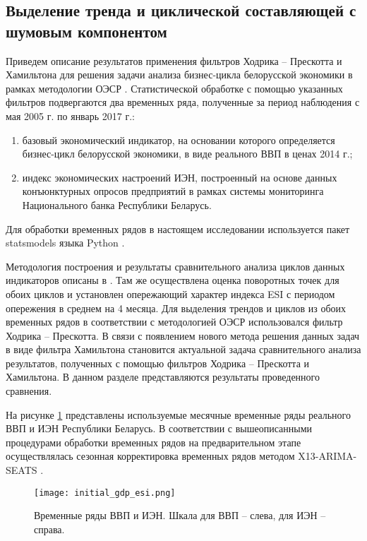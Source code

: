 \documentclass[a4paper,14pt]{extreport}
\begin{document}
	\subsection{Выделение тренда и циклической составляющей с шумовым компонентом}
	
	Приведем описание результатов применения фильтров Ходрика – Прескотта и Хамильтона для решения задачи анализа бизнес-цикла белорусской экономики в рамках методологии ОЭСР \cite{oecdCycleExtraction}. Статистической обработке с помощью указанных фильтров подвергаются два временных ряда, полученные за период наблюдения с мая 2005 г. по январь 2017 г.: 
	
	\begin{enumerate}
		\item базовый экономический индикатор, на основании которого определяется бизнес-цикл белорусской экономики, в виде реального ВВП в ценах 2014 г.;
		\item индекс экономических настроений ИЭН, построенный на основе данных конъюнктурных опросов предприятий в рамках системы мониторинга Национального банка Республики Беларусь.
	\end{enumerate}

	Для обработки временных рядов в настоящем исследовании используется пакет statsmodels языка Python \cite{statsmodels}.
	
	Методология построения и результаты сравнительного анализа циклов данных индикаторов описаны в \cite{esiMakingAlt}. Там же осуществлена оценка поворотных точек для обоих циклов и установлен опережающий характер индекса ESI с периодом опережения в среднем на 4 месяца. Для выделения трендов и циклов из обоих временных рядов в соответствии с методологией ОЭСР \cite{schuler_detrend} использовался фильтр Ходрика – Прескотта. В связи с появлением нового метода решения данных задач в виде фильтра Хамильтона становится актуальной задача сравнительного анализа результатов, полученных с помощью фильтров Ходрика – Прескотта и Хамильтона. В данном разделе представляются результаты проведенного сравнения. 
	
	На рисунке \ref{fig:inital_gdp_esi} представлены используемые месячные временные ряды реального ВВП и ИЭН Республики Беларусь. В соответствии с вышеописанными процедурами обработки временных рядов на предварительном этапе осуществлялась сезонная корректировка временных рядов методом X13-ARIMA-SEATS \cite{seasonalManual}.
	
	
	\begin{figure}
		\label{fig:inital_gdp_esi}
		\texttt{[image: initial\_gdp\_esi.png]}
		\caption{
			Временные ряды ВВП и ИЭН. 
			Шкала для ВВП – слева, для ИЭН – справа. 
		}
	\end{figure} 
\end{document}
